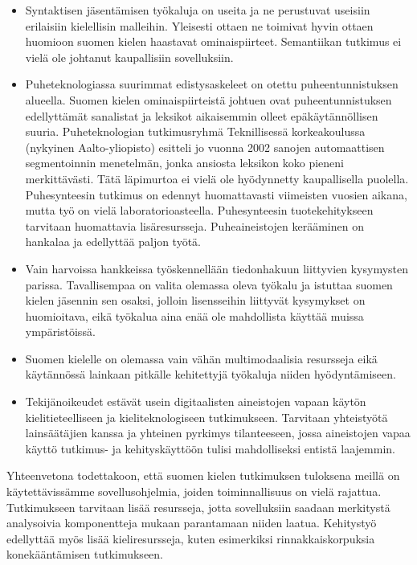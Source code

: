 \documentclass[]{../../metanetpaper}
\begin{document}
\begin{multicols}{2}
\begin{itemize}
\item Syntaktisen jäsentämisen työkaluja on useita ja ne perustuvat
    useisiin erilaisiin kielellisin malleihin. Yleisesti ottaen ne
    toimivat hyvin ottaen huomioon suomen kielen haastavat
    ominaispiirteet. Semantiikan tutkimus ei vielä ole johtanut
    kaupallisiin sovelluksiin.

\item Puheteknologiassa suurimmat edistysaskeleet on otettu
    puheentunnistuksen alueella. Suomen kielen ominaispiirteistä
    johtuen ovat puheentunnistuksen edellyttämät sanalistat ja
    leksikot aikaisemmin olleet epäkäytännöllisen suuria.
    Puheteknologian tutkimusryhmä Teknillisessä korkeakoulussa
    (nykyinen Aalto-yliopisto) esitteli jo vuonna 2002 sanojen
    automaattisen segmentoinnin menetelmän, jonka ansiosta leksikon
    koko pieneni merkittävästi. Tätä läpimurtoa ei vielä ole
    hyödynnetty kaupallisella puolella. Puhesynteesin tutkimus on
    edennyt huomattavasti viimeisten vuosien aikana, mutta työ on
    vielä laboratorioasteella. Puhesynteesin tuotekehitykseen
    tarvitaan huomattavia lisäresursseja. Puheaineistojen kerääminen
    on hankalaa ja edellyttää paljon työtä.

\item Vain harvoissa hankkeissa työskennellään tiedonhakuun liittyvien
    kysymysten parissa. Tavallisempaa on valita olemassa oleva työkalu
    ja istuttaa suomen kielen jäsennin sen osaksi, jolloin
    lisensseihin liittyvät kysymykset on huomioitava, eikä työkalua
    aina enää ole mahdollista käyttää muissa ympäristöissä.

\item Suomen kielelle on olemassa vain vähän multimodaalisia
    resursseja eikä käytännössä lainkaan pitkälle kehitettyjä
    työkaluja niiden hyödyntämiseen.

\item Tekijänoikeudet estävät usein digitaalisten aineistojen vapaan
    käytön kielitieteelliseen ja kieliteknologiseen
    tutkimukseen. Tarvitaan yhteistyötä lainsäätäjien kanssa ja
    yhteinen pyrkimys tilanteeseen, jossa aineistojen vapaa käyttö
    tutkimus- ja kehityskäyttöön tulisi mahdolliseksi entistä
    laajemmin.
\end{itemize}
Yhteenvetona todettakoon, että suomen kielen tutkimuksen tuloksena
meillä on käytettävissämme sovellusohjelmia, joiden toiminnallisuus on
vielä rajattua.  Tutkimukseen tarvitaan lisää resursseja, jotta
sovelluksiin saadaan merkitystä analysoivia komponentteja mukaan
parantamaan niiden laatua. Kehitystyö edellyttää myös lisää
kieliresursseja, kuten esimerkiksi rinnakkaiskorpuksia konekääntämisen
tutkimukseen.



\end{multicols}
\end{document}
